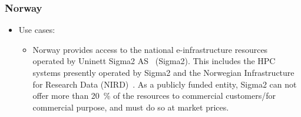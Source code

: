 \documentclass{article}
\begin{document}
\subsubsection{Norway}
\begin{itemize}
\item[] Use cases:
\begin{itemize}
\item[]
Norway provides access to the national e-infrastructure resources operated by Uninett Sigma2 AS~\cite{uninett-sigma2} (Sigma2). 
This includes the HPC systems presently operated by Sigma2 and the Norwegian Infrastructure for Research Data (NIRD)~\cite{nird}. As a publicly funded entity, Sigma2 can not offer more than 20~\% of the resources to commercial customers/for commercial purpose, and must do so at market prices.


\end{itemize}
\end{itemize}
\end{document}
